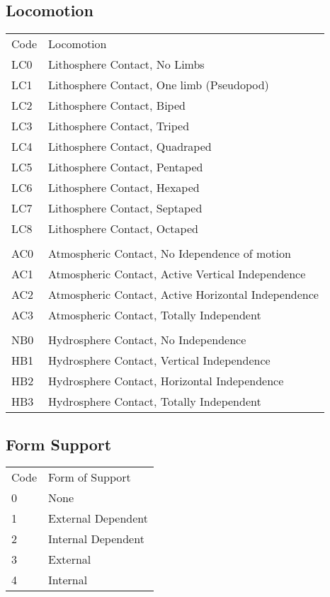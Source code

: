 \subsection{Locomotion}
		\begin{tabular}[t]{ll}
		Code &	Locomotion \\
		LC0	 &	Lithosphere Contact, No Limbs \\
		LC1	 &	Lithosphere Contact, One limb (Pseudopod) \\
		LC2	 &	Lithosphere Contact, Biped \\
		LC3	 &	Lithosphere Contact, Triped \\
		LC4	 &	Lithosphere Contact, Quadraped \\
		LC5	 &	Lithosphere Contact, Pentaped \\
		LC6	 &	Lithosphere Contact, Hexaped \\
		LC7	 &	Lithosphere Contact, Septaped \\
		LC8	 &	Lithosphere Contact, Octaped \\
			 &	                              \\
		AC0	 &	Atmospheric Contact, No Idependence of motion \\
		AC1	 &	Atmospheric Contact, Active Vertical Independence \\
		AC2	 &	Atmospheric Contact, Active Horizontal Independence \\
		AC3	 &	Atmospheric Contact, Totally Independent \\
			 &                                           \\
		NB0	 &	Hydrosphere Contact, No Independence \\
		HB1	 &	Hydrosphere Contact, Vertical Independence \\
		HB2	 &	Hydrosphere Contact, Horizontal Independence \\
		HB3	 &	Hydrosphere Contact, Totally Independent \\
		\end{tabular}

\subsection{Form Support}

	\begin{tabular}{ll}
		Code  &	Form of Support \\
		0	 &	None \\
		1	 &	External Dependent \\
		2	 &	Internal Dependent \\
		3	 &	External \\
		4	 &	Internal \\
		\end{tabular}

